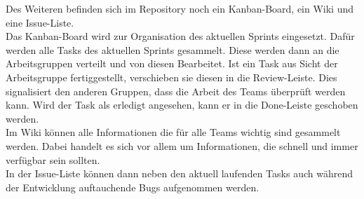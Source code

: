Des Weiteren befinden sich im Repository noch ein Kanban-Board, ein Wiki und eine Issue-Liste.\\
Das Kanban-Board wird zur Organisation des aktuellen Sprints eingesetzt. Dafür werden alle Tasks des aktuellen Sprints gesammelt. Diese werden dann an die Arbeitsgruppen verteilt und von diesen Bearbeitet. Ist ein Task aus Sicht der Arbeitsgruppe fertiggestellt, verschieben sie diesen in die Review-Leiste. Dies signalisiert den anderen Gruppen, dass die Arbeit des Teams überprüft werden kann. Wird der Task als erledigt angesehen, kann er in die Done-Leiste geschoben werden.\\

Im Wiki können alle Informationen die für alle Teams wichtig sind gesammelt werden. Dabei handelt es sich vor allem um Informationen, die schnell und immer verfügbar sein sollten.\\

In der Issue-Liste können dann neben den aktuell laufenden Tasks auch während der Entwicklung auftauchende Bugs aufgenommen werden.

